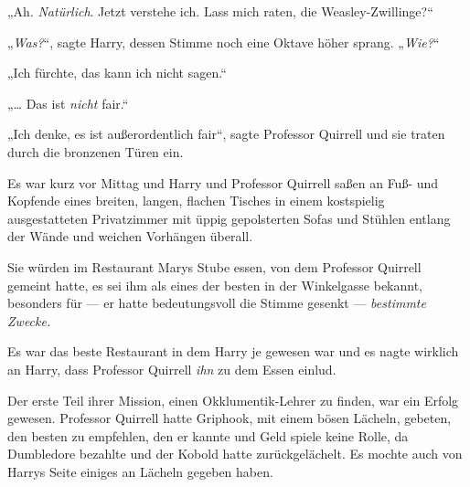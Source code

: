 „Ah. \emph{Natürlich}. Jetzt verstehe ich. Lass mich raten, die Weasley-Zwillinge?“

„\emph{Was?}“, sagte Harry, dessen Stimme noch eine Oktave höher sprang.
„\emph{Wie?}“

„Ich fürchte, das kann ich nicht sagen.“

„… Das ist \emph{nicht} fair.“

„Ich denke, es ist außerordentlich fair“, sagte Professor Quirrell und sie traten durch die bronzenen Türen ein.

\later

Es war kurz vor Mittag und Harry und Professor Quirrell saßen an Fuß- und Kopfende eines breiten, langen, flachen Tisches in einem kostspielig ausgestatteten Privatzimmer mit üppig gepolsterten Sofas und Stühlen entlang der Wände und weichen Vorhängen überall.

Sie würden im Restaurant Marys Stube essen, von dem Professor Quirrell gemeint hatte, es sei ihm als eines der besten in der Winkelgasse bekannt, besonders für — er hatte bedeutungsvoll die Stimme gesenkt — \emph{bestimmte Zwecke.}

Es war das beste Restaurant in dem Harry je gewesen war und es nagte wirklich an Harry, dass Professor Quirrell \emph{ihn} zu dem Essen einlud.

Der erste Teil ihrer Mission, einen Okklumentik-Lehrer zu finden, war ein Erfolg gewesen. Professor Quirrell hatte Griphook, mit einem bösen Lächeln, gebeten, den besten zu empfehlen, den er kannte und Geld spiele keine Rolle, da Dumbledore bezahlte und der Kobold hatte zurückgelächelt. Es mochte auch von Harrys Seite einiges an Lächeln gegeben haben.

